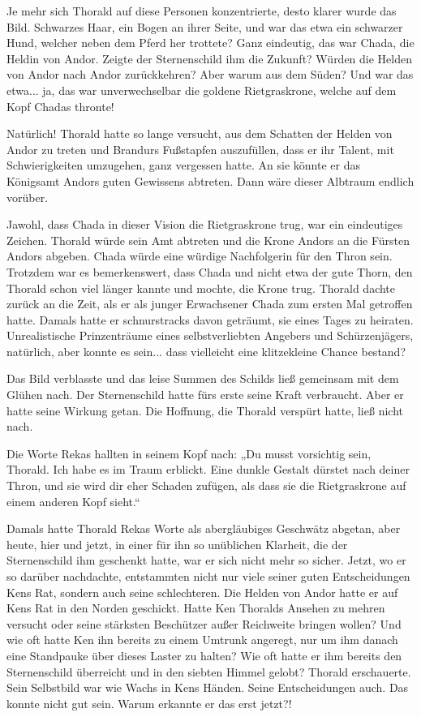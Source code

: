 \documentclass[10pt, a4paper, oneside]{book}
\begin{document}
Je mehr sich Thorald auf diese Personen konzentrierte, desto klarer wurde das Bild. Schwarzes Haar, ein Bogen an ihrer Seite, und war das etwa ein schwarzer Hund, welcher neben dem Pferd her trottete? Ganz eindeutig, das war Chada, die Heldin von Andor. Zeigte der Sternenschild ihm die Zukunft? Würden die Helden von Andor nach Andor zurückkehren? Aber warum aus dem Süden? Und war das etwa... ja, das war unverwechselbar die goldene Rietgraskrone, welche auf dem Kopf Chadas thronte!

Natürlich! Thorald hatte so lange versucht, aus dem Schatten der Helden von Andor zu treten und Brandurs Fußstapfen auszufüllen, dass er ihr Talent, mit Schwierigkeiten umzugehen, ganz vergessen hatte. An sie könnte er das Königsamt Andors guten Gewissens abtreten. Dann wäre dieser Albtraum endlich vorüber.

Jawohl, dass Chada in dieser Vision die Rietgraskrone trug, war ein eindeutiges Zeichen. Thorald würde sein Amt abtreten und die Krone Andors an die Fürsten Andors abgeben. Chada würde eine würdige Nachfolgerin für den Thron sein. Trotzdem war es bemerkenswert, dass Chada und nicht etwa der gute Thorn, den Thorald schon viel länger kannte und mochte, die Krone trug. Thorald dachte zurück an die Zeit, als er als junger Erwachsener Chada zum ersten Mal getroffen hatte. Damals hatte er schnurstracks davon geträumt, sie eines Tages zu heiraten. Unrealistische Prinzenträume eines selbstverliebten Angebers und Schürzenjägers, natürlich, aber konnte es sein... dass vielleicht eine klitzekleine Chance bestand?

Das Bild verblasste und das leise Summen des Schilds ließ gemeinsam mit dem Glühen nach. Der Sternenschild hatte fürs erste seine Kraft verbraucht. Aber er hatte seine Wirkung getan. Die Hoffnung, die Thorald verspürt hatte, ließ nicht nach.

Die Worte Rekas hallten in seinem Kopf nach: „Du musst vorsichtig sein, Thorald. Ich habe es im Traum erblickt. Eine dunkle Gestalt dürstet nach deiner Thron, und sie wird dir eher Schaden zufügen, als dass sie die Rietgraskrone auf einem anderen Kopf sieht.“

Damals hatte Thorald Rekas Worte als abergläubiges Geschwätz abgetan, aber heute, hier und jetzt, in einer für ihn so unüblichen Klarheit, die der Sternenschild ihm geschenkt hatte, war er sich nicht mehr so sicher. Jetzt, wo er so darüber nachdachte, entstammten nicht nur viele seiner guten Entscheidungen Kens Rat, sondern auch seine schlechteren. Die Helden von Andor hatte er auf Kens Rat in den Norden geschickt. Hatte Ken Thoralds Ansehen zu mehren versucht oder seine stärksten Beschützer außer Reichweite bringen wollen? Und wie oft hatte Ken ihn bereits zu einem Umtrunk angeregt, nur um ihm danach eine Standpauke über dieses Laster zu halten? Wie oft hatte er ihm bereits den Sternenschild überreicht und in den siebten Himmel gelobt? Thorald erschauerte. Sein Selbstbild war wie Wachs in Kens Händen. Seine Entscheidungen auch. Das konnte nicht gut sein. Warum erkannte er das erst jetzt?!
\end{document}
